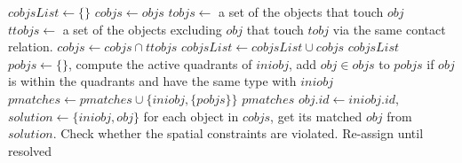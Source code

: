 \documentclass[letterpaper]{article}
\begin{document}
\begin{algorithm}[!]
\begin{algorithmic}[1]
\label{getSCO}
\State $cobjsList \leftarrow \{\}$
\State $cobjs \leftarrow objs$ 
\State $tobjs \leftarrow$ a set of the objects that touch $obj$
\State $ttobjs \leftarrow$ a set of the objects excluding $obj$ that touch $tobj$ via the same contact relation.
\State $cobjs \leftarrow cobjs \cap ttobjs$
\EndFor
\State $cobjsList \leftarrow cobjsList \cup cobjs$
\EndFor
\Return $cobjsList$
\EndProcedure
{}\label{MA}
\State $pobjs \leftarrow \{\}$, compute the active quadrants of $iniobj$, add $obj \in objs$ to $pobjs$ if $obj$ is within the quadrants and have the same type with $iniobj$ 
\State $pmatches \leftarrow pmatches \cup \{iniobj, \{pobjs\}\}$
\EndFor
\Return $pmatches$
\EndProcedure
{}
\State $obj.id \leftarrow iniobj.id$, $solution \leftarrow \{iniobj, obj\}$
\EndProcedure
{}\label{CommonMotion}
\State for each object in $cobjs$, get its matched $obj$ from $solution$. Check whether the spatial constraints are violated. Re-assign until resolved  
\EndFor
\EndProcedure
\end{algorithmic}
\end{algorithm}
\newpage



 
\end{document}
